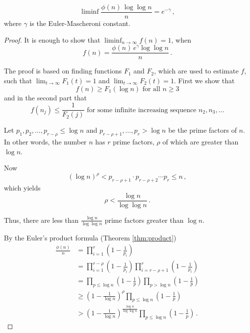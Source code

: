 \documentclass{article}
\begin{document}
\begin{theorem}
\begin{equation*}
    \liminf{\frac{\phi(n)\,\log\log n}{n}}=e^{-\gamma}\,,
\end{equation*}
where $\gamma$ is the Euler-Mascheroni constant.

\begin{proof}

It is enough to show that $\liminf_{n\rightarrow\infty}f(n) = 1$, when
\begin{equation*}
    f(n)= \frac{\phi(n)\,e^\gamma \log\log n}{n}\,.
\end{equation*}

The proof is based on finding functions $F_1$ and $F_2$, which are used to estimate $f$, such that $\lim_{t\rightarrow \infty} F_1(t) = 1$ and $\lim_{t\rightarrow \infty} F_2(t) = 1$. First we show that 
\begin{equation}
\label{eq:first}
    f(n) \geq F_1(\log n)\text{ for all }n\geq 3
\end{equation}
and in the second part that
\begin{equation}
\label{eq:second}
    f(n_j) \leq \frac{1}{F_2(j)}\text{ for some infinite increasing sequence }n_2, n_3,\dots
\end{equation}

Let $p_1,p_2,\dots,p_{r-\rho} \leq \log n$ and $p_{r-\rho+1},\dots,p_r > \log n$ be the prime factors of $n$. In other words, the number $n$ has $r$ prime factors, $\rho$ of which are greater than $\log n$.

Now
\begin{equation*}
    (\log n)^\rho < p_{r-\rho+1} \cdot p_{r-\rho+2} \cdots p_r \leq n\,,
\end{equation*}
which yields
\begin{equation*}
    \rho < \frac{\log n}{\log\log n}\,.
\end{equation*}

Thus, there are less than $\frac{\log n}{\log\log n}$ prime factors greater than $\log n$.

By the Euler's product formula (Theorem \ref{thm:product})
\begin{align*}
    \frac{\phi(n)}{n} & = \prod_{i=1}^r\left(1-\frac{1}{p_i}\right)\\
    & = \prod_{i=1}^{r-\rho}\left(1-\frac{1}{p_i}\right) \prod_{i=r-\rho+1}^r\left(1-\frac{1}{p_i}\right)\\
    & = \prod_{p\leq\log n}\left(1-\frac{1}{p}\right) \prod_{p>\log n}\left(1-\frac{1}{p}\right)\\
    & \geq \left(1-\frac{1}{\log n}\right)^\rho \prod_{p\leq\log n}\left(1-\frac{1}{p}\right) \\
    & > \left(1-\frac{1}{\log n}\right)^\frac{\log n}{\log \log n} \prod_{p\leq\log n}\left(1-\frac{1}{p}\right)\,.
\end{align*}


\end{proof}
\end{theorem}
\end{document}
